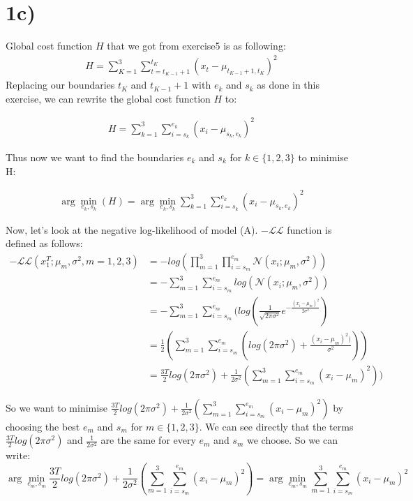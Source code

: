 	\section*{1c)} %
\label{sec:1c}
Global cost function $H$ that we got from exercise5 is as following: 
\begin{align*}
	H=\sum_{K=1}^{3}\sum_{t=t_{K-1}+1}^{t_K}(x_t-\mu_{t_{K-1}+1,t_K})^2  
\end{align*}
Replacing our boundaries ${t_K}$ and $t_{K-1}+1$ with $e_k$ and $s_k$ as done in this exercise, we can rewrite the global cost function $H$ to:

\begin{align}
	H=\sum_{k=1}^{3}\sum_{i=s_k}^{e_k}(x_i-\mu_{s_k,e_k})^2  \label{global_cost_exo_5}
\end{align}

Thus now we want to find the boundaries $e_k$ and $s_k$ for $k \in \{1,2,3\}$ to minimise H:

\begin{align*}
	\arg \min_{e_k,s_k}(H)= \arg \min_{e_k,s_k}\sum_{k=1}^{3}\sum_{i=s_k}^{e_k}(x_i-\mu_{s_k,e_k})^2
\end{align*}



Now, let's look at the negative log-likelihood of model (A). 
$-\mathcal{L}\mathcal{L}$ function is defined as follows: 
\begin{align*}
	-\mathcal{L}\mathcal{L}(x_1^T; \mu_m, \sigma^2, m = 1,2,3) &= -log(\prod_{m=1}^{3}\prod_{i=s_m}^{e_m}\mathcal{N}(x_i; \mu_m, \sigma^2)) \\
	&= -\sum_{m=1}^{3}\sum_{i=s_m}^{e_m}log(\mathcal{N}(x_i; \mu_m, \sigma^2)) \\
	&= -\sum_{m=1}^{3}\sum_{i=s_m}^{e_m}(log(\frac{1}{\sqrt{2\pi\sigma^2}}e^{-\frac{(x_i - \mu_m)^2}{2\sigma^2}}) \\
	&= \frac{1}{2}(\sum_{m=1}^{3}\sum_{i=s_m}^{e_m}(log(2\pi\sigma^2)+\frac{(x_i - \mu_m)^2)}{\sigma^2})) \\
	&= \frac{3T}{2}log(2\pi\sigma^2) + \frac{1}{2\sigma^2}(\sum_{m=1}^{3}\sum_{i=s_m}^{e_m}(x_i - \mu_m)^2)) 
\end{align*}

So we want to minimise $\frac{3T}{2}log(2\pi\sigma^2) + \frac{1}{2\sigma^2}(\sum_{m=1}^{3}\sum_{i=s_m}^{e_m}(x_i - \mu_m)^2)$ by choosing the 
best $e_m$ and $s_m$ for $m \in \{1,2,3\}$. We can see directly that the terms $\frac{3T}{2}log(2\pi\sigma^2)$ and $\frac{1}{2\sigma^2}$ are the same for  
every $e_m$ and $s_m$ we choose. So we can write: 
\[
\arg \min_{e_m,s_m}\frac{3T}{2}log(2\pi\sigma^2) + \frac{1}{2\sigma^2}(\sum_{m=1}^{3}\sum_{i=s_m}^{e_m}(x_i - \mu_m)^2) = \arg \min_{e_m,s_m}\sum_{m=1}^{3}\sum_{i=s_m}^{e_m}(x_i - \mu_{m})^2
\]


